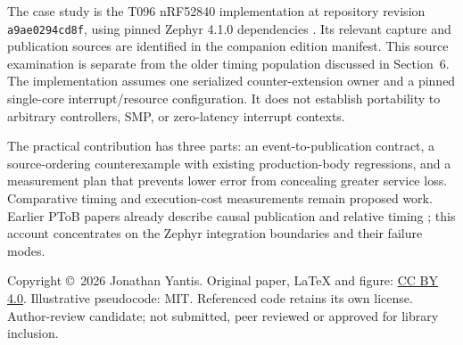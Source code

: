 \documentclass[10pt,letterpaper]{article}
\newcommand{\pin}{\texttt{a9ae0294cd8f}}
\begin{document}
The case study is the T096 nRF52840 implementation at repository revision \pin, using pinned Zephyr 4.1.0 dependencies \cite{implementation}. Its relevant capture and publication sources are identified in the companion edition manifest. This source examination is separate from the older timing population discussed in Section~6. The implementation assumes one serialized counter-extension owner and a pinned single-core interrupt/resource configuration. It does not establish portability to arbitrary controllers, SMP, or zero-latency interrupt contexts.

The practical contribution has three parts: an event-to-publication contract, a source-ordering counterexample with existing production-body regressions, and a measurement plan that prevents lower error from concealing greater service loss. Comparative timing and execution-cost measurements remain proposed work. Earlier PToB papers already describe causal publication and relative timing \cite{archive,own}; this account concentrates on the Zephyr integration boundaries and their failure modes.

\begin{center}
\end{center}
\vspace{-6pt}
{\footnotesize Copyright \copyright\ 2026 Jonathan Yantis. Original paper, LaTeX and figure:
\href{https://creativecommons.org/licenses/by/4.0/}{CC BY 4.0}. Illustrative pseudocode: MIT. Referenced code retains its own license.
Author-review candidate; not submitted, peer reviewed or approved for library inclusion.}
\newpage
\end{document}
